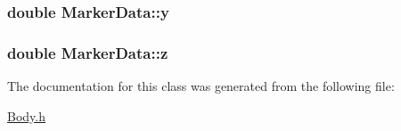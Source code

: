 \subsubsection[{\texorpdfstring{y}{y}}]{\setlength{\rightskip}{0pt plus 5cm}double Marker\+Data\+::y}\hypertarget{class_marker_data_a9b10ce07e886a94fc10e097b2cef2265}{}\label{class_marker_data_a9b10ce07e886a94fc10e097b2cef2265}
\subsubsection[{\texorpdfstring{z}{z}}]{\setlength{\rightskip}{0pt plus 5cm}double Marker\+Data\+::z}\hypertarget{class_marker_data_adc00ff164746747a7b379a94abf8a2df}{}\label{class_marker_data_adc00ff164746747a7b379a94abf8a2df}


The documentation for this class was generated from the following file\+:\begin{DoxyCompactItemize}
\item 
\hyperlink{_body_8h}{Body.\+h}\end{DoxyCompactItemize}
